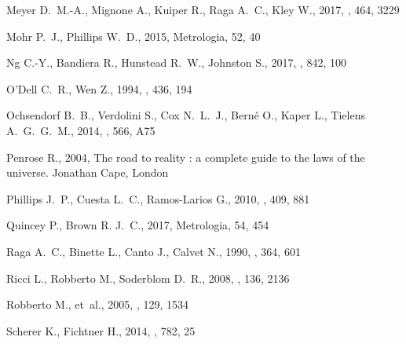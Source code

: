 \documentclass[useAMS, usenatbib, a4paper]{mnras}
\begin{document}
\begin{thebibliography}{}
{Meyer} D.~M.-A.,  {Mignone} A.,  {Kuiper} R.,  {Raga} A.~C.,   {Kley} W.,
  2017, \mnras, 464, 3229

Mohr P.~J.,  Phillips W.~D.,  2015, Metrologia, 52, 40

{Ng} C.-Y.,  {Bandiera} R.,  {Hunstead} R.~W.,   {Johnston} S.,  2017, \apj,
  842, 100

{O'Dell} C.~R.,  {Wen} Z.,  1994, \apj, 436, 194

{Ochsendorf} B.~B.,  {Verdolini} S.,  {Cox} N.~L.~J.,  {Bern{\'e}} O.,  {Kaper}
  L.,   {Tielens} A.~G.~G.~M.,  2014, \aap, 566, A75

{Penrose} R.,  2004, {The road to reality : a complete guide to the laws of the
  universe}.
Jonathan Cape, London

{Phillips} J.~P.,  {Cuesta} L.~C.,   {Ramos-Larios} G.,  2010, \mnras, 409, 881

Quincey P.,  Brown R. J.~C.,  2017, Metrologia, 54, 454

{Raga} A.~C.,  {Binette} L.,  {Canto} J.,   {Calvet} N.,  1990, \apj, 364, 601

{Ricci} L.,  {Robberto} M.,   {Soderblom} D.~R.,  2008, \aj, 136, 2136

{Robberto} M.,  et~al., 2005, \aj, 129, 1534

{Scherer} K.,  {Fichtner} H.,  2014, \apj, 782, 25


\end{thebibliography}
\end{document}
